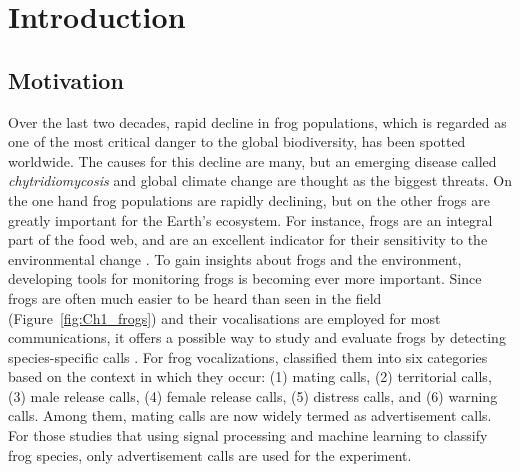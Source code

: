 
\chapter[Introduction]{Introduction}
\label{cha:cha1Introduction}
\section{Motivation}
Over the last two decades, rapid decline in frog populations, which is regarded as one of the most critical danger to the global biodiversity, has been spotted worldwide. The causes for this decline are many, but an emerging disease called \textit{chytridiomycosis} \citep{mutschmann2015chytridiomycosis} and global climate change \citep{carey2003climate} are thought as the biggest threats. On the one hand frog populations are rapidly declining, but on the other frogs are greatly important for the Earth's ecosystem. For instance, frogs are an integral part of the food web, and are an excellent indicator for their sensitivity to the environmental change \citep{boll2013amphibians}. To gain insights about frogs and the environment, developing tools for monitoring frogs is becoming ever more important. Since frogs are often much easier to be heard than seen in the field (Figure~\ref{fig:Ch1_frogs}) and their vocalisations are employed for most communications, it offers a possible way to study and evaluate frogs by detecting species-specific calls \citep{dorcas2009auditory}. For frog vocalizations, \cite{duellman1994biology} classified them into six categories based on the context in which they occur: (1) mating calls, (2) territorial calls, (3) male release calls, (4) female release calls, (5) distress calls, and (6) warning calls. Among them, mating calls are now widely termed as advertisement calls. For those studies that using signal processing and machine learning to classify frog species, only advertisement calls are used for the experiment.





